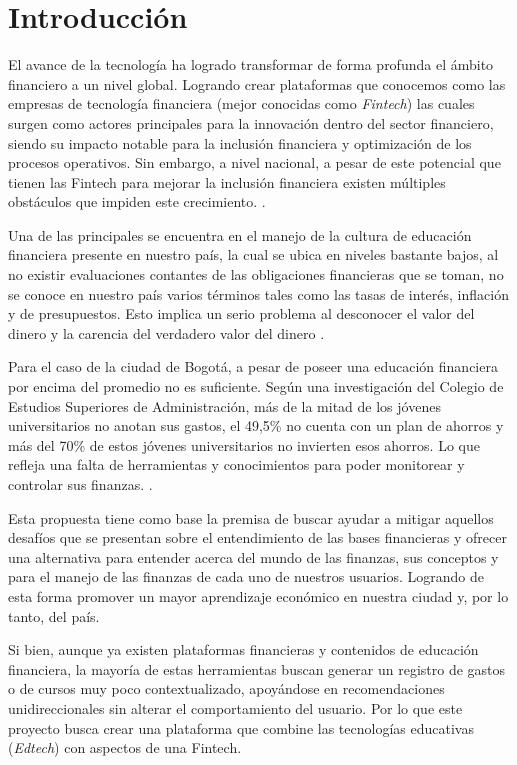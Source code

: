 \section*{Introducción}
{}
El avance de la tecnología ha logrado transformar de forma profunda el ámbito financiero a un nivel global. Logrando crear plataformas que conocemos como las empresas de tecnología financiera (mejor conocidas como \textit{Fintech}) las cuales surgen como actores principales para la innovación dentro del sector financiero, siendo su impacto notable para la inclusión financiera y optimización de los procesos operativos. Sin embargo, a nivel nacional, a pesar de este potencial que tienen las Fintech para mejorar la inclusión financiera existen múltiples obstáculos que impiden este crecimiento. \parencite[p.~8]{RevistaCIES01}.

Una de las principales se encuentra en el manejo de la cultura de educación financiera presente en nuestro país, la cual se ubica en niveles bastante bajos, al no existir evaluaciones contantes de las obligaciones financieras que se toman, no se conoce en nuestro país varios términos tales como las tasas de interés, inflación y de presupuestos. Esto implica un serio problema al desconocer el valor del dinero y la carencia del verdadero valor del dinero \parencite[p.~13]{UniversidadLibre01}.

Para el caso de la ciudad de Bogotá, a pesar de poseer una educación financiera por encima del promedio no es suficiente. Según una investigación del Colegio de Estudios Superiores de Administración, más de la mitad de los jóvenes universitarios no anotan sus gastos, el 49,5\% no cuenta con un plan de ahorros y más del 70\% de estos jóvenes universitarios no invierten esos ahorros. Lo que refleja una falta de herramientas y conocimientos para poder monitorear y controlar sus finanzas. \parencite[p.~57]{CESA01}.

Esta propuesta tiene como base la premisa de buscar ayudar a mitigar aquellos desafíos que se presentan sobre el entendimiento de las bases financieras y ofrecer una alternativa para entender acerca del mundo de las finanzas, sus conceptos y para el manejo de las finanzas de cada uno de nuestros usuarios. Logrando de esta forma promover un mayor aprendizaje económico en nuestra ciudad y, por lo tanto, del país.

Si bien, aunque ya existen plataformas financieras y contenidos de educación financiera, la mayoría de estas herramientas buscan generar un registro de gastos o de cursos muy poco contextualizado, apoyándose en recomendaciones unidireccionales sin alterar el comportamiento del usuario. Por lo que este proyecto busca crear una plataforma que combine las tecnologías educativas (\textit{Edtech}) con aspectos de una Fintech.

